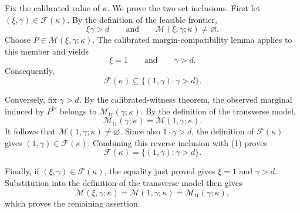Fix the calibrated value of \(\kappa\). We prove the two set inclusions. First let \((\xi,\gamma)\in\mathcal F(\kappa)\). By the definition of the feasible frontier,
\[
\xi\gamma>d
\qquad\text{and}\qquad
\mathcal M(\xi,\gamma;\kappa)\ne\varnothing.
\]
Choose \(P\in\mathcal M(\xi,\gamma;\kappa)\). The calibrated margin-compatibility lemma applies to this member and yields
\[
\xi=1
\qquad\text{and}\qquad
\gamma>d.
\]
Consequently,
\[
\mathcal F(\kappa)\subseteq\{(1,\gamma):\gamma>d\}.
\tag{1}
\]

Conversely, fix \(\gamma>d\). By the calibrated-witness theorem, the observed marginal induced by \(P^{\mathrm{tr}}\) belongs to \(\mathcal M_{\mathrm{tr}}(\gamma;\kappa)\). By the definition of the transverse model,
\[
\mathcal M_{\mathrm{tr}}(\gamma;\kappa)=\mathcal M(1,\gamma;\kappa).
\]
It follows that \(\mathcal M(1,\gamma;\kappa)\ne\varnothing\). Since also \(1\cdot\gamma>d\), the definition of \(\mathcal F(\kappa)\) gives \((1,\gamma)\in\mathcal F(\kappa)\). Combining this reverse inclusion with (1) proves
\[
\mathcal F(\kappa)=\{(1,\gamma):\gamma>d\}.
\]

Finally, if \((\xi,\gamma)\in\mathcal F(\kappa)\), the equality just proved gives \(\xi=1\) and \(\gamma>d\). Substitution into the definition of the transverse model then gives
\[
\mathcal M(\xi,\gamma;\kappa)
=\mathcal M(1,\gamma;\kappa)
=\mathcal M_{\mathrm{tr}}(\gamma;\kappa),
\]
which proves the remaining assertion.